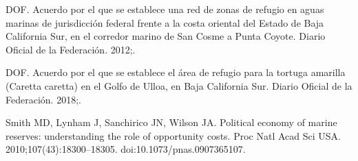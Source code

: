 \documentclass[10pt,letterpaper]{article}
\begin{document}
\begin{thebibliography}{10}
DOF.
\newblock Acuerdo por el que se establece una red de zonas de refugio en aguas
  marinas de jurisdicción federal frente a la costa oriental del Estado de
  Baja California Sur, en el corredor marino de San Cosme a Punta Coyote.
\newblock Diario Oficial de la Federación. 2012;.

DOF.
\newblock Acuerdo por el que se establece el área de refugio para la tortuga
  amarilla (Caretta caretta) en el Golfo de Ulloa, en Baja California Sur.
\newblock Diario Oficial de la Federación. 2018;.

Smith MD, Lynham J, Sanchirico JN, Wilson JA.
\newblock Political economy of marine reserves: understanding the role of
  opportunity costs.
\newblock Proc Natl Acad Sci {USA}. 2010;107(43):18300--18305.
\newblock doi:{10.1073/pnas.0907365107}.

\end{thebibliography}
\end{document}
